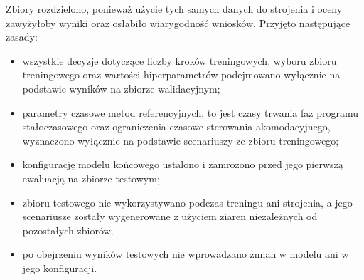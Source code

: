 Zbiory rozdzielono, ponieważ użycie tych samych danych do strojenia i oceny zawyżyłoby wyniki oraz osłabiło wiarygodność wniosków. Przyjęto następujące zasady:
\begin{itemize}
    \item wszystkie decyzje dotyczące liczby kroków treningowych, wyboru zbioru treningowego oraz wartości hiperparametrów podejmowano wyłącznie na podstawie wyników na zbiorze walidacyjnym;
    \item parametry czasowe metod referencyjnych, to jest czasy trwania faz programu stałoczasowego oraz ograniczenia czasowe sterowania akomodacyjnego, wyznaczono wyłącznie na podstawie scenariuszy ze zbioru treningowego;
    \item konfigurację modelu końcowego ustalono i zamrożono przed jego pierwszą ewaluacją na zbiorze testowym;
    \item zbioru testowego nie wykorzystywano podczas treningu ani strojenia, a jego scenariusze zostały wygenerowane z użyciem ziaren niezależnych od pozostałych zbiorów;
    \item po obejrzeniu wyników testowych nie wprowadzano zmian w modelu ani w jego konfiguracji.
\end{itemize}
